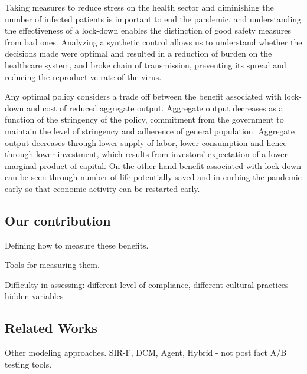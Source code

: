 \documentclass[preprint,authoryear,12pt]{elsarticle}
\begin{document}
	Taking measures to reduce stress on the health sector and diminishing the number of infected patients is important to end the pandemic, and understanding the effectiveness of a lock-down enables the distinction of good safety measures from bad ones. Analyzing a synthetic control allows us to understand whether the decisions made were optimal and resulted in a reduction of burden on the healthcare system, and broke chain of transmission, preventing its spread and reducing the reproductive rate of the virus.
	
	Any optimal policy considers a trade off between the benefit associated with lock-down and cost of reduced aggregate output. Aggregate output decreases as a function of the stringency of the policy, commitment from the government to maintain the level of stringency and adherence of general population. Aggregate output decreases through lower supply of labor, lower consumption and hence through lower investment, which results from investors’ expectation of a lower marginal product of capital. On the other hand benefit associated with lock-down can be seen through number of life potentially saved and in curbing the pandemic early so that economic activity can be restarted early.
	
	\subsection{Our contribution}
	Defining how to measure these benefits.
	
	Tools for measuring them.
	
	
	Difficulty in assessing: different level of compliance, different cultural practices - hidden variables
	
	\subsection{Related Works}
	Other modeling approaches. SIR-F, DCM, Agent, Hybrid - not post fact A/B testing tools.
	
\end{document}
